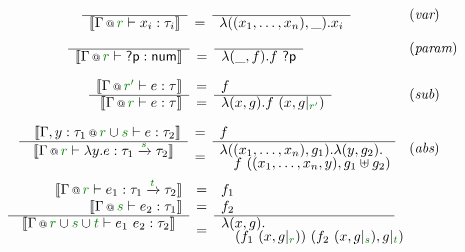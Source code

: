 \begin{figure}[t]
\begin{equation*}
\hspace{0em}
\begin{array}{ll}
\hspace{4.5em}\semdef
  {\coctx{\Gamma}{\cclrd{r}} \vdash x_i : \tau_i}
  {\lambda ((x_1, \ldots, x_n), \_) . x_i}
& (\emph{var})
\\[0.0em]
\hspace{3.5em}\semdef
  {\coctx{\Gamma}{\cclrd{r}} \vdash \ident{?p} : \ident{num}}
  {\lambda (\_, f) . f~\ident{?p}}
& (\emph{param})
\\[1.5em]
\hspace{5em}\semdeff
  {\coctx{\Gamma}{\cclrd{r'}} \vdash e : \tau}
  {\coctx{\Gamma}{\cclrd{r}} \vdash e : \tau}
  {f}
  {\lambda (x, g) . f~(x, \restr{g}{\cclrd{r'}})}
& (\emph{sub})
\\[1.5em]
\hspace{0em}\emdeff
  {\coctx{\Gamma,y:\tau_1}{\cclrd{r}\cup\cclrd{s}} \vdash e : \tau_2}
  {\begin{array}{l}\sem{\coctx{\Gamma}{\cclrd{r}} \vdash \lambda y. e : \tau_1 \xrightarrow{\cclrd{s}} \tau_2}\\[-0.25em]~\end{array}}
  {f}
  {\hspace{-0.5em}\begin{array}{l}
  \lambda ((x_1, \ldots, x_n), g_1) . \lambda (y, g_2) .\\[-0.25em]
  \quad f~((x_1, \ldots, x_n, y), g_1 \uplus g_2)
  \end{array}\hspace{-1em}~}
& (\emph{abs})
\\[1.5em]
\hspace{-0.8em}\emdefff
  {\coctx{\Gamma}{\cclrd{r}} \vdash e_1 : \tau_1 \xrightarrow{\cclrd{t}} \tau_2}
  {\coctx{\Gamma}{\cclrd{s}} \vdash e_2 : \tau_1}
  {\begin{array}{l}\sem{\coctx{\Gamma}{\cclrd{r}\cup\cclrd{s}\cup\cclrd{t}} \vdash e_1~e_2 : \tau_2}\\[-0.25em]~\end{array}}
  {f_1}
  {f_2}
  {\hspace{-0.5em}\begin{array}{l}
  \lambda (x, g) . \\[-0.25em]
  \quad(f_1~(x, \restr{g}{\cclrd{r}}))~(f_2~(x, \restr{g}{\cclrd{s}} ), \restr{g}{\cclrd{t}})
  \end{array}\hspace{-2em}~}

\end{array}
\end{equation*}
\end{figure}
